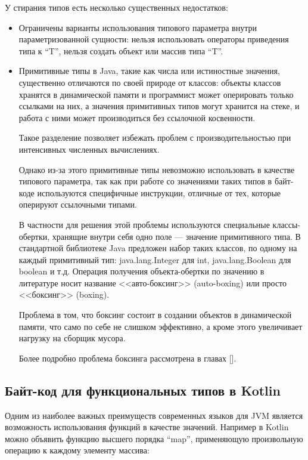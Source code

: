 У стирания типов есть несколько существенных недостатков:
\begin{itemize}
    \item Ограничены варианты использования типового параметра внутри параметризованной сущности:
    нельзя использовать операторы приведения типа к ``T'', нельзя создать объект или массив
    типа ``T''.
    \item Примитивные типы в Java, такие как числа или истиностные значения, существенно отличаются
    по своей природе от классов: объекты классов хранятся в динамической памяти и программист
    может оперировать только ссылками на них, а значения примитивных типов могут хранится на стеке,
    и работа с ними может производиться без ссылочной косвенности.

    Такое разделение позволяет избежать проблем с производительностью при интенсивных численных
    вычислениях.

    Однако из-за этого примитивные типы невозможно использовать в качестве типового параметра,
    так как при работе со значениями таких типов в байт-коде используются специфичные инструкции,
    отличные от тех, которые оперируют ссылочными типами.

    В частности для решения этой проблемы используются специальные классы-обертки, хранящие внутри
    себя одно поле --- значение примитивного типа. В стандартной библиотеке Java предложен набор
    таких классов, по одному на каждый примитивный тип: java.lang.Integer для int,
    java.lang.Boolean для boolean и т.д. Операция получения объекта-обертки по значению
    в литературе носит название <<авто-боксинг>> (auto-boxing) или просто <<боксинг>> (boxing).

    Проблема в том, что боксинг состоит в создании объектов в динамической памяти, что само по себе
    не слишком эффективно, а кроме этого увеличивает нагрузку на сборщик мусора.

    Более подробно проблема боксинга рассмотрена в главах [].
\end{itemize}

\subsection{Байт-код для функциональных типов в Kotlin}
Одним из наиболее важных преимуществ современных языков для JVM является возможность использования
функций в качестве значений.
Например в Kotlin можно объявить функцию высшего порядка ``map'', применяющую произвольную операцию
к каждому элементу массива:

